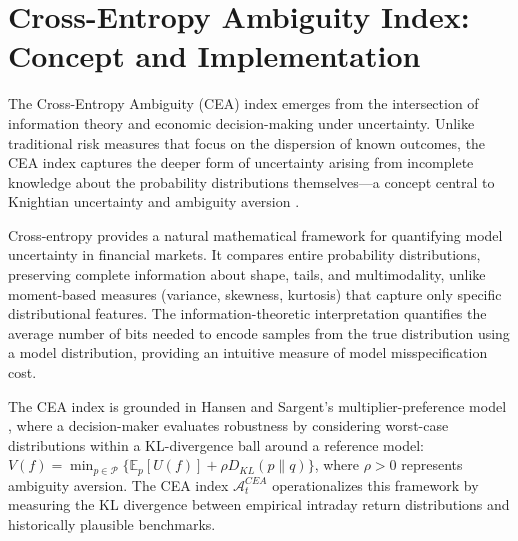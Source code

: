 \documentclass[preprint,12pt,authoryear]{elsarticle}
\begin{document}
\clearpage
\appendix

\section{Cross-Entropy Ambiguity Index: Concept and Implementation}

\renewcommand{\theequation}{A.\arabic{equation}}
\setcounter{equation}{0}
\renewcommand{\thetable}{A.\arabic{table}}
\setcounter{table}{0}
\renewcommand{\thefigure}{A.\arabic{figure}}
\setcounter{figure}{0}

The Cross-Entropy Ambiguity (CEA) index emerges from the intersection of information theory and economic decision-making under uncertainty. Unlike traditional risk measures that focus on the dispersion of known outcomes, the CEA index captures the deeper form of uncertainty arising from incomplete knowledge about the probability distributions themselves—a concept central to Knightian uncertainty \citep{knight1921} and ambiguity aversion \citep{ellsberg1961}.

Cross-entropy provides a natural mathematical framework for quantifying model uncertainty in financial markets. It compares entire probability distributions, preserving complete information about shape, tails, and multimodality, unlike moment-based measures (variance, skewness, kurtosis) that capture only specific distributional features. The information-theoretic interpretation quantifies the average number of bits needed to encode samples from the true distribution using a model distribution, providing an intuitive measure of model misspecification cost.

The CEA index is grounded in Hansen and Sargent's multiplier-preference model \citep{hansen2001}, where a decision-maker evaluates robustness by considering worst-case distributions within a KL-divergence ball around a reference model: $V(f) = \min_{p \in \mathcal{P}} \{\mathbb{E}_p[U(f)] + \rho D_{KL}(p\|q)\}$, where $\rho > 0$ represents ambiguity aversion. The CEA index $\mathcal{A}^{CEA}_t$ operationalizes this framework by measuring the KL divergence between empirical intraday return distributions and historically plausible benchmarks.

\end{document}
